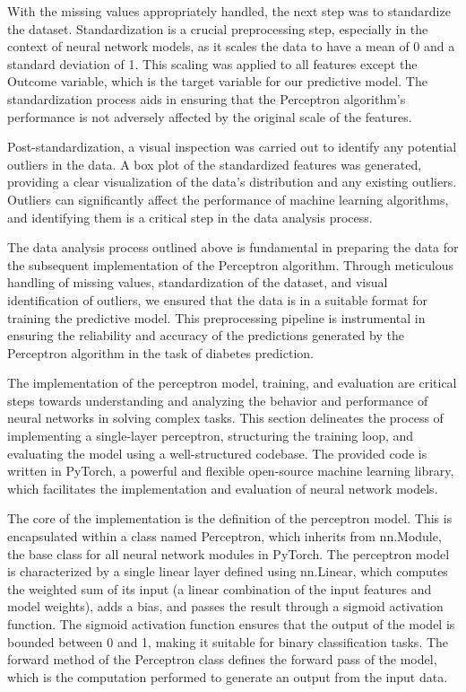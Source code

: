 \documentclass[10pt,twocolumn,letterpaper]{article}
\begin{document}
With the missing values appropriately handled, the next step was to standardize the dataset. Standardization is a crucial preprocessing step, especially in the context of neural network models, as it scales the data to have a mean of 0 and a standard deviation of 1. This scaling was applied to all features except the Outcome variable, which is the target variable for our predictive model. The standardization process aids in ensuring that the Perceptron algorithm's performance is not adversely affected by the original scale of the features.

Post-standardization, a visual inspection was carried out to identify any potential outliers in the data. A box plot of the standardized features was generated, providing a clear visualization of the data's distribution and any existing outliers. Outliers can significantly affect the performance of machine learning algorithms, and identifying them is a critical step in the data analysis process.

The data analysis process outlined above is fundamental in preparing the data for the subsequent implementation of the Perceptron algorithm. Through meticulous handling of missing values, standardization of the dataset, and visual identification of outliers, we ensured that the data is in a suitable format for training the predictive model. This preprocessing pipeline is instrumental in ensuring the reliability and accuracy of the predictions generated by the Perceptron algorithm in the task of diabetes prediction.

The implementation of the perceptron model, training, and evaluation are critical steps towards understanding and analyzing the behavior and performance of neural networks in solving complex tasks. This section delineates the process of implementing a single-layer perceptron, structuring the training loop, and evaluating the model using a well-structured codebase. The provided code is written in PyTorch, a powerful and flexible open-source machine learning library, which facilitates the implementation and evaluation of neural network models.

The core of the implementation is the definition of the perceptron model. This is encapsulated within a class named Perceptron, which inherits from nn.Module, the base class for all neural network modules in PyTorch. The perceptron model is characterized by a single linear layer defined using nn.Linear, which computes the weighted sum of its input (a linear combination of the input features and model weights), adds a bias, and passes the result through a sigmoid activation function. The sigmoid activation function ensures that the output of the model is bounded between 0 and 1, making it suitable for binary classification tasks. The forward method of the Perceptron class defines the forward pass of the model, which is the computation performed to generate an output from the input data.
\end{document}
